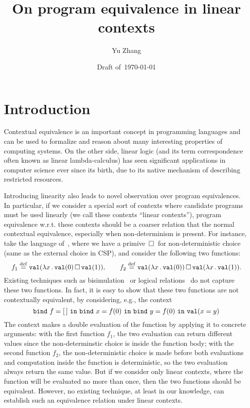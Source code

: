 \documentclass[10pt,a4]{article}
\begin{document}
\title{On program equivalence in linear contexts}
\author{Yu Zhang}
\date{Draft of~\today}

\maketitle

\section{Introduction}

Contextual equivalence is an important concept in programming languages and can be used to 
formalize and reason about many interesting properties of computing systems. 
On the other side, linear logic (and its term correspondence often known as linear lambda-calculus) 
has seen significant applications in computer science ever since its birth, 
due to its native mechanism of describing restricted resources. 

Introducing linearity also leads to novel observation over program equivalences. 
In particular, if we consider a special sort of contexts where candidate programs must be used linearly 
(we call these contexts ``linear contexts''), program equivalence w.r.t. these contexts should be a coarser  
relation that the normal contextual equivalence, especially when non-determinism is present. 
For instance, take the language of~\cite{jefferay}, where we have a primive $\,\square\,$ for non-deterministic 
choice (same as the external choice in CSP), and consider the following two functions:
\[
f_1 \stackrel{\mathrm{def}}{=} \mathtt{val}(\lambda x \, . \, \mathtt{val}(0) \,\square\, \mathtt{val}(1)) ,
\qquad
f_2 \stackrel{\mathrm{def}}{=} \mathtt{val}(\lambda x \, . \, \mathtt{val}(0)) \,\square\, \mathtt{val}(\lambda x \, . \, \mathtt{val}(1)).
\]
Existing techniques such as bisimulation~\cite{} or logical relations~\cite{} 
do not capture these two functions. In fact, it is easy to show that these two functions are not 
contextually equivalent, by considering, e.g., the context 
\[
\mathtt{bind} \ {f} = {[\,]} \ \mathtt{in} \ {} \mathtt{bind} \ {x} = {f (0)} \ \mathtt{in} \ {}\mathtt{bind} \ {y} = {f (0)} \ \mathtt{in} \ {\mathtt{val}(x = y)}
\]
The context makes a double evaluation of the function by applying it to concrete arguments: 
with the first function $f_1$, the two evaluation can return different values since the non-determinstic 
choice is inside the function body; with the second function $f_2$, the non-deterministic choice is made 
before both evaluations and computation inside the function is deterministic, so the two evaluation 
always return the same value. 
But if we consider only linear contexts, where the function will be evaluated no more than once, 
then the two functions should be equivalent. However, no existing technique, at least in our knowledge, 
can establish such an equivalence relation under linear contexts. 
\end{document}
